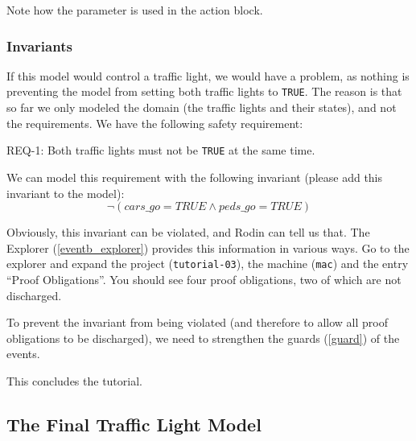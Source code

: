 Note how the parameter is used in the action block.

\subsubsection{Invariants}
\label{tutorial:invariants}

If this model would control a traffic light, we would have a problem, as nothing is preventing the model from setting both traffic lights to \texttt{TRUE}.  The reason is that so far we only modeled the domain (the traffic lights and their states), and not the requirements.  We have the following safety requirement:

\begin{center}REQ-1: Both traffic lights must not be \texttt{TRUE} at the same time.\end{center}

We can model this requirement with the following invariant (please add this invariant to the model):
\[
\lnot  (cars\_go = TRUE \land  peds\_go = TRUE)
\]

Obviously, this invariant can be violated, and Rodin can tell us that.  The Explorer (\ref{eventb_explorer}) provides this information in various ways.  Go to the explorer and expand the project (\texttt{tutorial-03}), the machine (\texttt{mac}) and the entry ``Proof Obligations''.  You should see four proof obligations, two of which are not discharged.


To prevent the invariant from being violated (and therefore to allow all proof obligations to be discharged), we need to strengthen the guards (\ref{guard}) of the events.


This concludes the tutorial.

\subsection{The Final Traffic Light Model}


